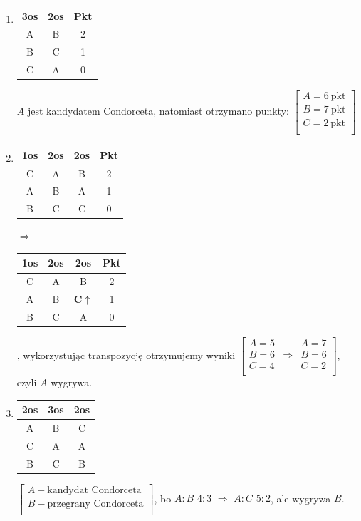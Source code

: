 \documentclass[12pt,a4paper]{article}
\theoremstyle{break}
\begin{document}
		\begin{enumerate}[K1)]
			\item \begin{tabular}{|c|c|c|}\hline
				3os & 2os & Pkt\\\hline
				A & B & 2\\\hline
				B & C & 1\\\hline
				C & A & 0\\\hline
			\end{tabular}
			$A$ jest kandydatem Condorceta, natomiast otrzymano punkty: $\begin{bmatrix}
				A=6\ \text{pkt}\\
				B=7\ \text{pkt}\\
				C=2\ \text{pkt}\\
			\end{bmatrix}$
			
			\item \begin{tabular}{|c|c|c|c|}\hline
				1os & 2os & 2os & Pkt\\\hline
				C & A & B & 2\\\hline
				A & B & A & 1\\\hline
				B & C & C & 0\\\hline
			\end{tabular} $\Rightarrow$ \begin{tabular}{|c|c|c|c|}\hline
				1os & 2os & 2os & Pkt\\\hline
				C & A & B & 2\\\hline
				A & B & \textbf{C$\uparrow$} & 1\\\hline
				B & C & A & 0\\\hline
			\end{tabular}, wykorzystując transpozycję otrzymujemy wyniki $\begin{bmatrix}
				A=5 && A=7\\
				B=6 & \Rightarrow & B=6\\
				C=4 && C=2\\
			\end{bmatrix}$, czyli $A$ wygrywa.
			
			\item \begin{tabular}{|c|c|c|}\hline
				2os & 3os & 2os\\\hline
				A & B & C\\\hline
				C & A & A\\\hline
				B & C & B\\\hline
			\end{tabular} $\begin{bmatrix}
				A - \text{kandydat Condorceta}\\
				B - \text{przegrany Condorceta}\\
			\end{bmatrix}$, bo $A:B$ $4:3$ $\Rightarrow$ $A:C$ $5:2$, ale wygrywa $B$.
			

\end{enumerate}
\end{document}

